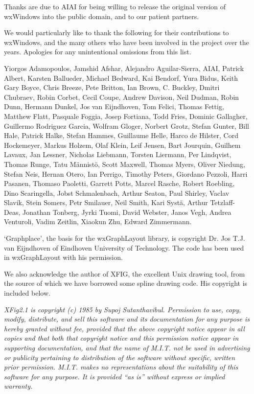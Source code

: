 Thanks are due to AIAI for being willing to release the original version of
wxWindows into the public domain, and to our patient partners.

We would particularly like to thank the following for their contributions to wxWindows, and the many others who have been involved in
the project over the years. Apologies for any unintentional omissions from this list. 
 
Yiorgos Adamopoulos, Jamshid Afshar, Alejandro Aguilar-Sierra, AIAI, Patrick Albert, Karsten Ballueder, Michael Bedward, Kai Bendorf, Yura Bidus, Keith 
Gary Boyce, Chris Breeze, Pete Britton, Ian Brown, C. Buckley, Dmitri Chubraev, Robin Corbet, Cecil Coupe, Andrew Davison, Neil Dudman, Robin 
Dunn, Hermann Dunkel, Jos van Eijndhoven, Tom Felici, Thomas Fettig, Matthew Flatt, Pasquale Foggia, Josep Fortiana, Todd Fries, Dominic Gallagher, 
Guillermo Rodriguez Garcia, Wolfram Gloger, Norbert Grotz, Stefan Gunter, Bill Hale, Patrick Halke, Stefan Hammes, Guillaume Helle, Harco de Hilster, Cord Hockemeyer, Markus 
Holzem, Olaf Klein, Leif Jensen, Bart Jourquin, Guilhem Lavaux, Jan Lessner, Nicholas Liebmann, Torsten Liermann, Per Lindqvist, Thomas Runge, Tatu
M\"{a}nnist\"{o}, Scott Maxwell, Thomas Myers, Oliver Niedung, Stefan Neis, Hernan Otero, Ian Perrigo, Timothy Peters, Giordano Pezzoli, Harri Pasanen, Thomaso Paoletti, 
Garrett Potts, Marcel Rasche, Robert Roebling, Dino Scaringella, Jobst Schmalenbach, Arthur Seaton, Paul Shirley, Vaclav Slavik, Stein Somers, Petr Smilauer, Neil Smith, 
Kari Syst\"{a}, Arthur Tetzlaff-Deas, Jonathan Tonberg, Jyrki Tuomi, David Webster, Janos Vegh, Andrea Venturoli, Vadim Zeitlin, Xiaokun Zhu, Edward Zimmermann.

`Graphplace', the basis for the wxGraphLayout library, is copyright Dr. Jos
T.J. van Eijndhoven of Eindhoven University of Technology. The code has
been used in wxGraphLayout with his permission.

We also acknowledge the author of XFIG, the excellent Unix drawing tool,
from the source of which we have borrowed some spline drawing code.
His copyright is included below.

{\it XFig2.1 is copyright (c) 1985 by Supoj Sutanthavibul. Permission to
use, copy, modify, distribute, and sell this software and its
documentation for any purpose is hereby granted without fee, provided
that the above copyright notice appear in all copies and that both that
copyright notice and this permission notice appear in supporting
documentation, and that the name of M.I.T. not be used in advertising or
publicity pertaining to distribution of the software without specific,
written prior permission.  M.I.T. makes no representations about the
suitability of this software for any purpose.  It is provided ``as is''
without express or implied warranty.}

